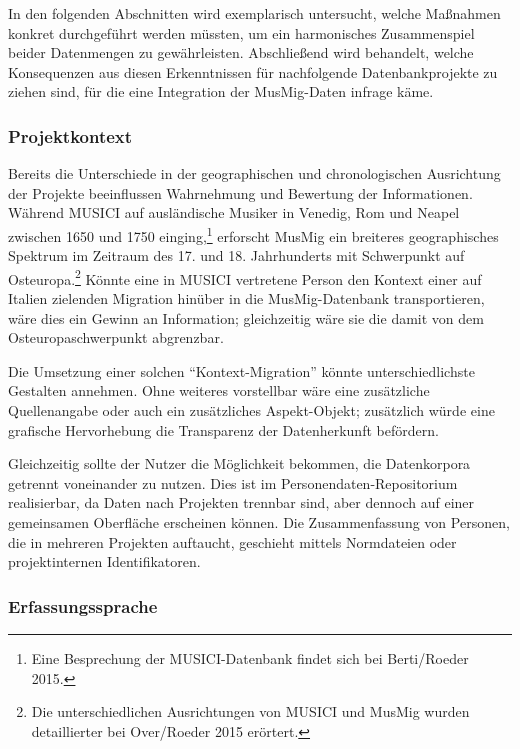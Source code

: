 \documentclass[a4paper,
fontsize=11pt,
oneside,
numbers=noperiodatend,
parskip=half-,
bibliography=totoc,
final
]{scrartcl}
\begin{document}
In den folgenden Abschnitten wird exemplarisch untersucht, welche
Maßnahmen konkret durchgeführt werden müssten, um ein harmonisches
Zusammenspiel beider Datenmengen zu gewährleisten. Abschließend wird
behandelt, welche Konsequenzen aus diesen Erkenntnissen für nachfolgende
Datenbankprojekte zu ziehen sind, für die eine Integration der
MusMig-Daten infrage käme.

\subsubsection*{Projektkontext}\label{projektkontext}

Bereits die Unterschiede in der geographischen und chronologischen
Ausrichtung der Projekte beeinflussen Wahrnehmung und Bewertung der
Informationen. Während MUSICI auf ausländische Musiker in Venedig, Rom
und Neapel zwischen 1650 und 1750 einging,\footnote{Eine Besprechung der
  MUSICI-Datenbank findet sich bei Berti/Roeder 2015.} erforscht MusMig
ein breiteres geographisches Spektrum im Zeitraum des 17. und 18.
Jahrhunderts mit Schwerpunkt auf Osteuropa.\footnote{Die
  unterschiedlichen Ausrichtungen von MUSICI und MusMig wurden
  detaillierter bei Over/Roeder 2015 erörtert.} Könnte eine in MUSICI
vertretene Person den Kontext einer auf Italien zielenden Migration
hinüber in die MusMig-Datenbank transportieren, wäre dies ein Gewinn an
Information; gleichzeitig wäre sie die damit von dem
Osteuropaschwerpunkt abgrenzbar.

Die Umsetzung einer solchen \enquote{Kontext-Migration} könnte
unterschiedlichste Gestalten annehmen. Ohne weiteres vorstellbar wäre
eine zusätzliche Quellenangabe oder auch ein zusätzliches Aspekt-Objekt;
zusätzlich würde eine grafische Hervorhebung die Transparenz der
Datenherkunft befördern.

Gleichzeitig sollte der Nutzer die Möglichkeit bekommen, die
Datenkorpora getrennt voneinander zu nutzen. Dies ist im
Personendaten-Repositorium realisierbar, da Daten nach Projekten
trennbar sind, aber dennoch auf einer gemeinsamen Oberfläche erscheinen
können. Die Zusammenfassung von Personen, die in mehreren Projekten
auftaucht, geschieht mittels Normdateien oder projektinternen
Identifikatoren.

\subsubsection*{Erfassungssprache}\label{erfassungssprache}
\end{document}
